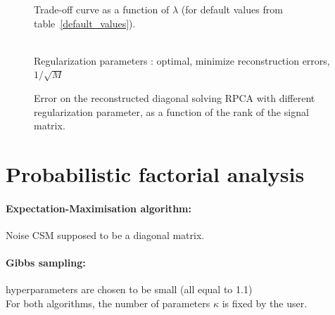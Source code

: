 \documentclass[fontsize=12pt,DIV13,paper=a4,abstract=true,titlepage=false]{scrartcl}
\begin{document}
\begin{figure}
	\centering
	
	\caption{Trade-off curve as a function of $\lambda$ (for default values from table~\ref{default_values}). \label{l-curve}}
\end{figure}


\begin{figure}[H]
		\centering		
		
		\hspace{0.5cm}\\
		
		Regularization parameters :  optimal, 
		 minimize reconstruction errors, 
		 $1/\sqrt{M}$
		
		\caption{Error on the reconstructed diagonal solving RPCA with different regularization parameter, as a function of the rank of the signal matrix.
		\label{error_rpca}}
\end{figure}



\section{Probabilistic factorial analysis}

\paragraph{Expectation-Maximisation algorithm:} Noise CSM supposed to be a diagonal matrix.

\paragraph{Gibbs sampling:} hyperparameters are chosen to be small (all equal to 1.1)\\
For both algorithms, the number of parameters $\kappa$ is fixed by the user.
\end{document}
